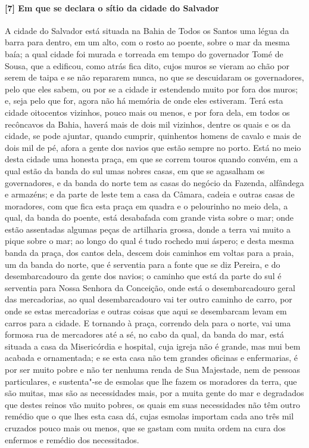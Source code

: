 \begin{linenumbers}
\paragraph{[7] Em que se declara o sítio da cidade do Salvador} \quad
A cidade do Salvador está situada na Bahia de Todos os Santos uma légua da barra para
dentro, em um alto, com o rosto ao poente, sobre o mar da mesma baía; a qual cidade foi
murada e torreada em tempo do governador Tomé de Sousa, que a edificou, como atrás fica
dito, cujos muros se vieram ao chão por serem de taipa e se não repararem nunca, no que se
descuidaram os governadores, pelo que eles sabem, ou por se a cidade ir estendendo muito
por fora dos muros; e, seja pelo que for, agora não há memória de onde eles estiveram.
Terá esta cidade oitocentos vizinhos, pouco mais ou menos, e por fora dela, em todos os
recôncavos da Bahia, haverá mais de dois mil vizinhos, dentre os quais e os da cidade, se
pode ajuntar, quando cumprir, quinhentos homens de cavalo e mais de dois mil de pé, afora
a gente dos navios que estão sempre no porto. Está no meio desta cidade uma honesta praça,
em que se correm touros quando convém, em a qual estão da banda do sul umas nobres casas,
em que se agasalham os governadores, e da banda do norte tem as casas do negócio da
Fazenda, alfândega e armazéns; e da parte de leste tem a casa da Câmara, cadeia e outras
casas de moradores, com que fica esta praça em quadra e o pelourinho no meio dela, a qual,
da banda do poente, está desabafada com grande vista sobre o mar; onde estão assentadas
algumas peças de artilharia grossa, donde a terra vai muito a pique sobre o mar; ao longo
do qual é tudo rochedo mui áspero; e desta mesma banda da praça, dos cantos dela, descem
dois caminhos em voltas para a praia, um da banda do norte, que é serventia para a fonte
que se diz Pereira, e do desembarcadouro da gente dos navios; o caminho que está da parte
do sul é serventia para Nossa Senhora da Conceição, onde está o desembarcadouro geral das
mercadorias, ao qual desembarcadouro vai ter outro caminho de carro, por onde se estas
mercadorias e outras coisas que aqui se desembarcam levam em carros para a cidade. E
tornando à praça, correndo dela para o norte, vai uma formosa rua de mercadores até a sé,
no cabo da qual, da banda do mar, está situada a casa da Misericórdia e hospital, cuja
igreja não é grande, mas mui bem acabada e ornamentada; e se esta casa não tem grandes
oficinas e enfermarias, é por ser muito pobre e não ter nenhuma renda de Sua Majestade,
nem de pessoas particulares, e sustenta"-se de esmolas que lhe fazem os moradores da terra,
que são muitas, mas são as necessidades mais, por a muita gente do mar e degradados que
destes reinos vão muito pobres, os quais em suas necessidades não têm outro remédio que o
que lhes esta casa dá, cujas esmolas importam cada ano três mil cruzados pouco mais ou
menos, que se gastam com muita ordem na cura dos enfermos e remédio dos necessitados.


\end{linenumbers}
